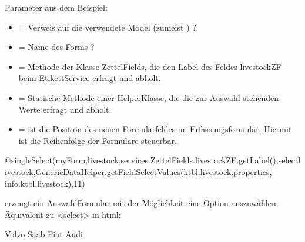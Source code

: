 \documentclass[letterpaper,10pt,ngerman]{sphinxmanual}
\begin{document}
Parameter aus dem Beispiel:
\begin{itemize}
\item {} 
 = Verweis auf die verwendete Model (zumeist ) ?

\item {} 
 = Name des Forms ?

\item {} 
 = Methode der Klasse ZettelFields, die den Label des Feldes livestockZF beim Etikett\sphinxhyphen{}Service erfragt und abholt.

\item {} 
 = Statische Methode einer Helper\sphinxhyphen{}Klasse, die die zur Auswahl stehenden Werte erfragt und abholt.

\item {} 
 = ist die Position des neuen Formularfeldes im Erfassungsformular. Hiermit ist die Reihenfolge der Formulare steuerbar.

\end{itemize}

\begin{sphinxVerbatim}[commandchars=\\\{\}]
@singleSelect(myForm,\PYGZdq{}livestock\PYGZdq{},services.ZettelFields.livestockZF.getLabel(),\PYGZdq{}select\PYGZhy{}livestock\PYGZdq{},GenericDataHelper.getFieldSelectValues(\PYGZdq{}ktbl.livestock.properties\PYGZdq{}, \PYGZdq{}info.ktbl.livestock\PYGZdq{}),11)
\end{sphinxVerbatim}

 erzeugt ein Auswahl\sphinxhyphen{}Formular mit der Möglichkeit eine Option auszuwählen. Äquivalent zu \textless{}select\textgreater{} in html:

\begin{sphinxVerbatim}[commandchars=\\\{\}]
   
     Volvo
     Saab
     Fiat
     Audi
\end{sphinxVerbatim}
\end{document}
